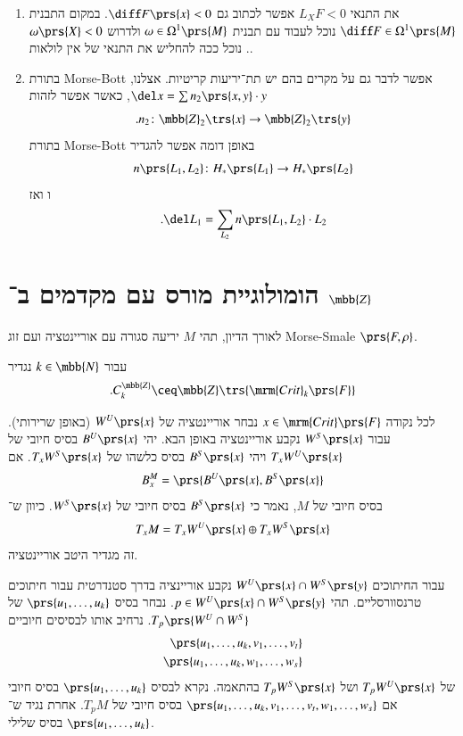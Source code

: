 \documentclass[a4paper,10pt,twoside,openany]{book}
\begin{document}
\begin{enumerate}
\item את התנאי
$L_X F < 0$
אפשר לכתוב גם
$\diff F \prs{x} < 0$.
במקום התבנית
$\diff F \in \Omega^1\prs{M}$
נוכל לעבוד עם תבנית
$\omega \in \Omega^1\prs{M}$
ולדרוש
$\omega\prs{X} < 0$.
נוכל ככה להחליש את התנאי של אין לולאות.

\item
בתורת
\textenglish{Morse-Bott}
אפשר לדבר גם על מקרים בהם יש תת־יריעות קריטיות.
אצלנו,
$\del x = \sum n_2\prs{x,y} \cdot y$,
כאשר אפשר לזהות
\[\text{.} n_2 \colon \mbb{Z}_2\trs{x} \to \mbb{Z}_2\trs{y}\]
בתורת
\textenglish{Morse-Bott}
באופן דומה אפשר להגדיר
\[n\prs{L_1, L_2} \colon H_*\prs{L_1} \to H_*\prs{L_2}\]ו
ואז
\begin{align*}
\text{.} \del L_1 = \sum_{L_2} n\prs{L_1, L_2} \cdot L_2
\end{align*}
\end{enumerate}


\section{הומולוגיית מורס עם מקדמים ב־%
$\mbb{Z}$}

לאורך הדיון, תהי
$M$
יריעה סגורה עם אוריינטציה ועם זוג
\textenglish{Morse-Smale}
$\prs{F,\rho}$.

\begin{definition}
עבור
$k \in \mbb{N}$
נגדיר
\[\text{.} C_k^{\mbb{Z}} \ceq \mbb{Z} \trs{\mrm{Crit}_k\prs{F}}\]
\end{definition}

לכל נקודה
$x \in \mrm{Crit}\prs{F}$
נבחר אוריינטציה של
$W^U\prs{x}$
(באופן שרירותי).
עבור
$W^S\prs{x}$
נקבע אוריינטציה באופן הבא.
יהי
$B^U\prs{x}$
בסיס חיובי של
$T_x W^U\prs{x}$
ויהי
$B^S\prs{x}$
בסיס כלשהו של
$T_x W^S\prs{x}$.
אם
\[B_x^M = \prs{B^U\prs{x}, B^S\prs{x}}\]
בסיס חיובי של
$M$,
נאמר כי
$B^S\prs{x}$
בסיס חיובי של
$W^S\prs{x}$.
כיוון ש־%
\[T_x M = T_x W^U\prs{x} \oplus T_x W^S\prs{x}\]
זה מגדיר היטב אוריינטציה.

עבור החיתוכים
$W^U\prs{x} \cap W^S\prs{y}$
נקבע אוריינציה בדרך סטנדרטית עבור חיתוכים טרנסוורסליים.
תהי
$p \in W^U\prs{x} \cap W^S\prs{y}$.
נבחר בסיס
$\prs{u_1, \ldots, u_k}$
של
$T_p\prs{W^U\cap W^S}$.
נרחיב אותו לבסיסים חיוביים
\begin{align*}
\prs{u_1, \ldots, u_k, v_1, \ldots, v_t} \\
\prs{u_1, \ldots, u_k, w_1, \ldots, w_s}
\end{align*}
של
$T_p W^U\prs{x}$
ושל
$T_p W^S\prs{x}$
בהתאמה.
נקרא לבסיס
$\prs{u_1, \ldots, u_k}$
בסיס חיובי אם
$\prs{u_1, \ldots, u_k, v_1, \ldots, v_t, w_1, \ldots, w_s}$
בסיס חיובי של
$T_p M$.
אחרת נגיד ש־%
$\prs{u_1, \ldots, u_k}$
בסיס שלילי.
\end{document}
